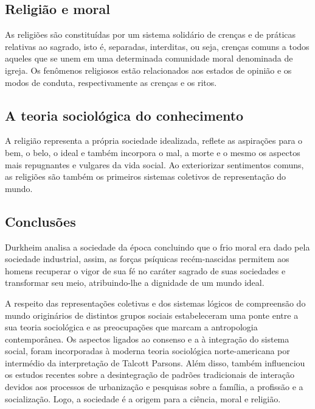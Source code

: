 \subsection{Religião e moral}

As religiões são constituídas por um sistema solidário de crenças e de práticas relativas ao sagrado, isto é, separadas, interditas, ou seja, crenças comuns a todos aqueles que se unem em uma determinada comunidade moral denominada de igreja.
Os fenômenos religiosos estão relacionados aos estados de opinião e os modos de conduta, respectivamente as crenças e os ritos.


\subsection{A teoria sociológica do conhecimento}

A religião representa a própria sociedade idealizada, reflete as aspirações para o bem, o belo, o ideal e também incorpora o mal, a morte e o mesmo os aspectos mais repugnantes e vulgares da vida social.
Ao exteriorizar sentimentos comuns, as religiões são também os primeiros sistemas coletivos de representação do mundo.


\subsection{Conclusões}

Durkheim analisa a sociedade da época concluindo que o frio moral era dado pela sociedade industrial, assim, as forças psíquicas recém-nascidas permitem aos homens recuperar o vigor de sua fé no caráter sagrado de suas sociedades e transformar seu meio, atribuindo-lhe a dignidade de um mundo ideal.

A respeito das representações coletivas e dos sistemas lógicos de compreensão do mundo originários de distintos grupos sociais estabeleceram uma ponte entre a sua teoria sociológica e as preocupações que marcam a antropologia contemporânea.
Os aspectos ligados ao consenso e a à integração do sistema social, foram incorporadas à moderna teoria sociológica norte-americana por intermédio da interpretação de Talcott Parsons. 
Além disso, também influenciou os estudos recentes sobre a desintegração de padrões tradicionais de interação devidos aos processos de urbanização e pesquisas sobre a família, a profissão e a socialização.
Logo, a sociedade é a origem para a ciência, moral e religião.

